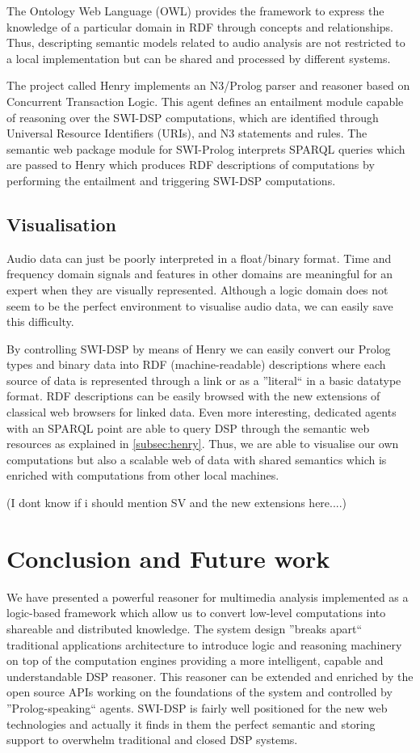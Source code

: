 \documentclass[runningheads]{llncs}
\begin{document}
The Ontology Web Language (OWL) provides the framework to express the knowledge of a particular domain in RDF through concepts and relationships. Thus, descripting semantic models related to audio analysis are not restricted to a local implementation but can be shared and processed by different systems.

The project called Henry implements an N3/Prolog parser and reasoner based on Concurrent Transaction Logic. This agent defines an entailment module capable of reasoning over the SWI-DSP computations, which are identified through Universal Resource Identifiers (URIs), and N3 statements and rules. The semantic web package module for SWI-Prolog interprets SPARQL queries which are passed to Henry which produces RDF descriptions of computations by performing the entailment and triggering SWI-DSP computations.

\subsection{Visualisation}\label{subsec:vis}

Audio data can just be poorly interpreted in a float/binary format. Time and frequency domain signals and features in other domains are meaningful for an expert when they are visually represented. Although a logic domain does not seem to be the perfect environment to visualise audio data, we can easily save this difficulty. 

By controlling SWI-DSP by means of Henry we can easily convert our Prolog types and binary data into RDF (machine-readable) descriptions where each source of data is represented through a link or as a ''literal`` in a basic datatype format. RDF descriptions can be easily browsed with the new extensions of classical web browsers for linked data. Even more interesting, dedicated agents with an SPARQL point are able to query DSP through the semantic web resources as explained in \ref{subsec:henry}. Thus, we are able to visualise our own computations but also a scalable web of data with shared semantics which is enriched with computations from other local machines.

(I dont know if i should mention SV and the new extensions here....)

\section{Conclusion and Future work}\label{sec:conclusion}

We have presented a powerful reasoner for multimedia analysis implemented as a logic-based framework which allow us to convert low-level computations into shareable and distributed knowledge. The system design ''breaks apart`` traditional applications architecture to introduce logic and reasoning machinery on top of the computation engines providing a more intelligent, capable and understandable DSP reasoner. This reasoner can be extended and enriched by the open source APIs working on the foundations of the system and controlled by ''Prolog-speaking`` agents. SWI-DSP is fairly well positioned for the new web technologies and actually it finds in them the perfect semantic and storing support to overwhelm traditional and closed DSP systems.
\end{document}
